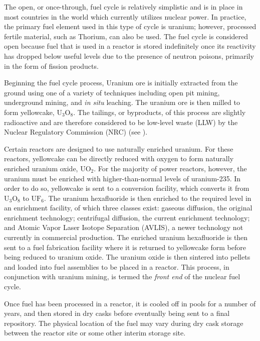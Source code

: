 The open, or once-through, fuel cycle is relatively simplistic and is in place
in most countries in the world which currently utilizes nuclear power. In
practice, the primary fuel element used in this type of cycle is uranium;
however, processed fertile material, such as Thorium, can also be used. The fuel
cycle is considered open because fuel that is used in a reactor is stored
indefinitely once its reactivity has dropped below useful levels due to the
presence of neutron poisons, primarily in the form of fission products.

Beginning the fuel cycle process, Uranium ore is initially extracted from the
ground using one of a variety of techniques including open pit mining,
underground mining, and \textit{in situ} leaching. The uranium ore is then
milled to form yellowcake, $\mathrm{U_3O_8}$. The tailings, or byproducts, of
this process are slightly radioactive and are therefore considered to be
low-level waste (LLW) by the Nuclear Regulatory Commission (NRC)
(see \cite{nrc_10_1985}).

Certain reactors are designed to use naturally enriched uranium. For these
reactors, yellowcake can be directly reduced with oxygen to form naturally
enriched uranium oxide, $\mathrm{UO_2}$. For the majority of power reactors,
however, the uranium must be enriched with higher-than-normal levels of
uranium-235. In order to do so, yellowcake is sent to a conversion facility,
which converts it from $\mathrm{U_3O_8}$ to $\mathrm{UF_6}$. The uranium
hexafluoride is then enriched to the required level in an enrichment facility,
of which three classes exist: gaseous diffusion, the original enrichment
technology; centrifugal diffusion, the current enrichment technology; and Atomic
Vapor Laser Isotope Separation (AVLIS), a newer technology not currently in
commercial production. The enriched uranium hexafluoride is then sent to a fuel
fabrication facility where it is returned to yellowcake form before being
reduced to uranium oxide. The uranium oxide is then sintered into pellets and
loaded into fuel assemblies to be placed in a reactor. This process, in
conjunction with uranium mining, is termed the \textit{front end} of the nuclear
fuel cycle.

Once fuel has been processed in a reactor, it is cooled off in pools for a
number of years, and then stored in dry casks before eventually being sent to a
final repository. The physical location of the fuel may vary during dry cask
storage between the reactor site or some other interim storage site.


